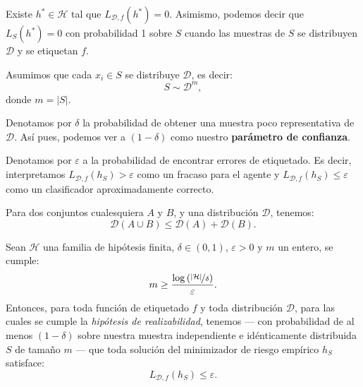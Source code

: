 \documentclass[8pt,a4paper]{extarticle}
\begin{document}
\begin{multicols}{3}
	\begin{boxdef}
		Existe $h^* \in \mathcal{H}$ tal que $L_{\mathcal{D}, f} (h^*) = 0$. Asimismo, podemos decir que $L_S (h^*) = 0$ con probabilidad 1 sobre  $S$ cuando las muestras de $S$ se distribuyen  $\mathcal{D}$ y se etiquetan $f$.
	\end{boxdef}

	\begin{boxdef}
		Asumimos que cada $x_i \in S$ se distribuye  $\mathcal{D}$, es decir:
		\[
			S \sim \mathcal{D}^m
			,\]
		donde $m = \left| S \right| $.
	\end{boxdef}

	\begin{boxrmk}
		Denotamos por $\delta$ la probabilidad de obtener una muestra poco representativa de  $\mathcal{D}$. Así pues, podemos ver a $(1 - \delta)$ como nuestro \textbf{parámetro de confianza}.
	\end{boxrmk}

	\begin{boxrmk}
		Denotamos por $\varepsilon$ a la probabilidad de encontrar errores de etiquetado. Es decir, interpretamos  $L_{\mathcal{D}, f} (h_S) > \varepsilon$ como un fracaso para el agente y $L_{\mathcal{D}, f} (h_S) \le \varepsilon$ como un clasificador aproximadamente correcto.
	\end{boxrmk}

	\begin{boxlemma}[]
		Para dos conjuntos cualesquiera $A$ y $B$, y una distribución $\mathcal{D}$, tenemos:
		\[
			\mathcal{D}\left( A \cup B \right) \le \mathcal{D}(A) + \mathcal{D}(B)
			.\]
	\end{boxlemma}

	\begin{boxcor}[]
		Sean $\mathcal{H}$ una familia de hipótesis finita, $\delta \in (0,1)$,  $\varepsilon > 0$ y $m$ un entero, se cumple:
		\[
			m \ge \frac{\log \left( \nicefrac{\left| \mathcal{H} \right| }{\delta} \right)  }{\varepsilon}
			.\]
		Entonces, para toda función de etiquetado $f$ y toda distribución  $\mathcal{D}$, para las cuales se cumple la \emph{hipótesis de realizabilidad}, tenemos --- con probabilidad de al menos $(1 - \delta)$ sobre nuestra muestra independiente e idénticamente distribuida $S$ de tamaño $m$ --- que toda solución del minimizador de riesgo empírico $h_S$ satisface:
		\[
			L_{\mathcal{D}, f} (h_S) \le \varepsilon
			.\]
	\end{boxcor}


\end{multicols}
\end{document}
